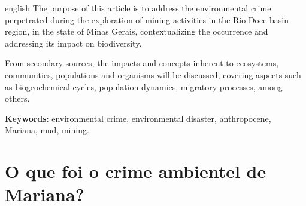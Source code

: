 \documentclass[
article,			%
11pt,				%
oneside,			%
a4paper,			%
english,			%
brazil,				%
sumario=tradicional
]{abntex2}
\begin{document}
	\renewcommand{\resumoname}{Abstract}
	\begin{resumoumacoluna}
		\begin{otherlanguage*}{english}
			The purpose of this article is to address the environmental crime perpetrated during the exploration of mining activities in the Rio Doce basin region, in the state of Minas Gerais, contextualizing the occurrence and addressing its impact on biodiversity.
			
			From secondary sources, the impacts and concepts inherent to ecosystems, communities, populations and organisms will be discussed, covering aspects such as biogeochemical cycles, population dynamics, migratory processes, among others.
			
			\vspace{\onelineskip}
			
			\noindent
			\textbf{Keywords}: environmental crime, environmental disaster, anthropocene, Mariana, mud, mining.
		\end{otherlanguage*}
	\end{resumoumacoluna}
	
	
	\textual
	\cleardoublepage	%
	
%	
%	
	
	
	\section{O que foi o crime ambientel de Mariana?}
	
\end{document}
